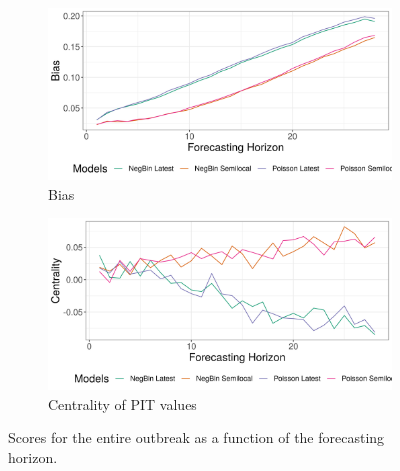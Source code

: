 \begin{figure}[H]
\begin{subfigure}{0.5\textwidth}
  \centering
  \includegraphics[width=\linewidth]{../output/Bunia_bias.png}  
  \caption{Bias}
  \label{fig:sub-third}
\end{subfigure}
\begin{subfigure}{0.5\textwidth}
  \centering
  \includegraphics[width=\linewidth]{../output/Bunia_centrality.png}  
  \caption{Centrality of PIT values}
  \label{fig:nat_scores_4}
\end{subfigure}
  \caption{Scores for the entire outbreak as a function of the forecasting horizon.}

  \label{fig:nat_scores}
\end{figure}
